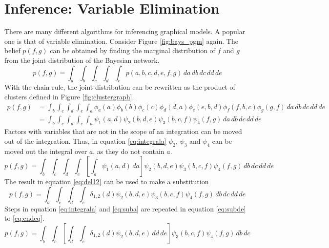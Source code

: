 \documentclass[12pt,oneside,openany,a4paper, %
afrikaans,english,
]{memoir}
\numberwithin{equation}{chapter}
\begin{document}
\section{Inference: Variable Elimination}
There are many different algorithms for inferencing graphical models. A popular one is that of variable elimination. 
Consider Figure \ref{fig:bays_pgm} again. The belief $p(f,g)$ can be obtained by finding the marginal distribution of $f$ and $g$ from the joint distribution of the Bayesian network. 
\begin{equation}
p(f,g) = \int_a\int_b\int_c\int_d\int_e p(a,b,c,d,e,f,g)\,da\,db\,dc\,dd\,de
\end{equation}
With the chain rule, the joint distribution can be rewritten as the product of clusters defined in Figure \ref{fig:clustergraph}.
\begin{equation}
\begin{split}
p(f,g) & = \int_b\int_c\int_d\int_e\int_a\phi_a(a)\phi_b(b)\phi_c(c)\phi_d(d,a)\phi_e(e,b,d)\phi_f(f,b,c)\phi_g(g,f)\,da\,db\,dc\,dd\,de\\
& = \int_b\int_c\int_d\int_e\int_a \psi_1(a,d)\psi_2(b,d,e)\psi_3(b,c,f)\psi_4(f,g)\,da\,db\,dc\,dd\,de
\end{split}
\end{equation}%
Factors with variables that are not in the scope of an integration can be moved out of the integration. Thus, in equation \ref{eq:integrala} $\psi_2$, $\psi_3$ and $\psi_4$ can be moved out the integral over $a$, as they do not contain $a$.
\begin{equation}
\label{eq:integrala}
p(f,g) = \int_b\int_c\int_d\int_e\left[\int_a\psi_1(a,d)\,da\right]\psi_2(b,d,e)\psi_3(b,c,f)\psi_4(f,g)\,db\,dc\,dd\,de
\end{equation}
The result in equation \ref{eq:del12} can be used to make a substitution
\begin{equation}\label{eq:suba}
p(f,g) = \int_b\int_c\int_d\int_e\delta_{1,2}(d)\psi_2(b,d,e)\psi_3(b,c,f)\psi_4(f,g)\,db\,dc\,dd\,de
\end{equation}
Steps in equation \ref{eq:integrala} and \ref{eq:suba} are repeated in equation \ref{eq:subde} to \ref{eq:endeq}.
\begin{equation}\label{eq:subde}
p(f,g) = \int_b\int_c\left[\int_d\int_e\delta_{1,2}(d)\psi_2(b,d,e)\,dd\,de\right]\psi_3(b,c,f)\psi_4(f,g)\,db\,dc
\end{equation}
\end{document}
